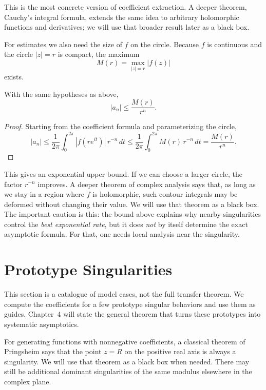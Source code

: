 This is the most concrete version of coefficient extraction. A deeper theorem, Cauchy's integral formula, extends the same idea to arbitrary holomorphic functions and derivatives; we will use that broader result later as a black box.

For estimates we also need the size of $f$ on the circle. Because $f$ is continuous and the circle $|z|=r$ is compact, the maximum
\[
  M(r) = \max_{|z|=r} |f(z)|
\]
exists.

\begin{proposition}
With the same hypotheses as above,
\[
  |a_n| \le \frac{M(r)}{r^n}.
\]
\end{proposition}

\begin{proof}
Starting from the coefficient formula and parameterizing the circle,
\[
  |a_n|
  \le \frac{1}{2\pi}\int_0^{2\pi} |f(re^{it})|\, r^{-n}\,dt
  \le \frac{1}{2\pi}\int_0^{2\pi} M(r)\, r^{-n}\,dt
  = \frac{M(r)}{r^n}.
\]
\end{proof}

This gives an exponential upper bound. If we can choose a larger circle, the factor $r^{-n}$ improves. A deeper theorem of complex analysis says that, as long as we stay in a region where $f$ is holomorphic, such contour integrals may be deformed without changing their value. We will use that theorem as a black box. The important caution is this: the bound above explains why nearby singularities control the \emph{best exponential rate}, but it does \emph{not} by itself determine the exact asymptotic formula. For that, one needs local analysis near the singularity.

\section{Prototype Singularities}

This section is a catalogue of model cases, not the full transfer theorem. We compute the coefficients for a few prototype singular behaviors and use them as guides. Chapter~4 will state the general theorem that turns these prototypes into systematic asymptotics.

For generating functions with nonnegative coefficients, a classical theorem of Pringsheim says that the point $z=R$ on the positive real axis is always a singularity. We will use that theorem as a black box when needed. There may still be additional dominant singularities of the same modulus elsewhere in the complex plane.

